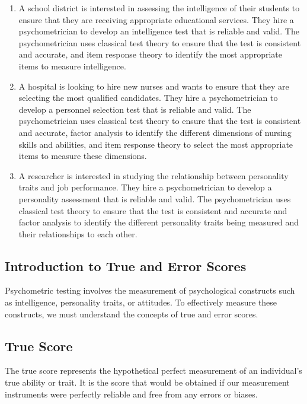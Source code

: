 \documentclass[
]{article}
\providecommand{\tightlist}{%
  \setlength{\itemsep}{0pt}\setlength{\parskip}{0pt}}
\begin{document}
\begin{enumerate}
\def\labelenumi{\arabic{enumi}.}
\tightlist
\item
  A school district is interested in assessing the intelligence of their
  students to ensure that they are receiving appropriate educational
  services. They hire a psychometrician to develop an intelligence test
  that is reliable and valid. The psychometrician uses classical test
  theory to ensure that the test is consistent and accurate, and item
  response theory to identify the most appropriate items to measure
  intelligence.
\item
  A hospital is looking to hire new nurses and wants to ensure that they
  are selecting the most qualified candidates. They hire a
  psychometrician to develop a personnel selection test that is reliable
  and valid. The psychometrician uses classical test theory to ensure
  that the test is consistent and accurate, factor analysis to identify
  the different dimensions of nursing skills and abilities, and item
  response theory to select the most appropriate items to measure these
  dimensions.
\item
  A researcher is interested in studying the relationship between
  personality traits and job performance. They hire a psychometrician to
  develop a personality assessment that is reliable and valid. The
  psychometrician uses classical test theory to ensure that the test is
  consistent and accurate and factor analysis to identify the different
  personality traits being measured and their relationships to each
  other.
\end{enumerate}

\hypertarget{introduction-to-true-and-error-scores}{%
\subsection{Introduction to True and Error
Scores}\label{introduction-to-true-and-error-scores}}

Psychometric testing involves the measurement of psychological
constructs such as intelligence, personality traits, or attitudes. To
effectively measure these constructs, we must understand the concepts of
true and error scores.

\hypertarget{true-score}{%
\subsection{True Score}\label{true-score}}

The true score represents the hypothetical perfect measurement of an
individual’s true ability or trait. It is the score that would be
obtained if our measurement instruments were perfectly reliable and free
from any errors or biases.
\end{document}
